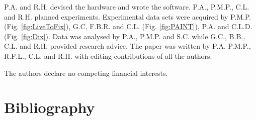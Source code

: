 \begin{contributions}
    P.A. and R.H. devised the hardware and wrote the software. P.A., P.M.P., C.L. and R.H. planned experiments. Experimental data sets were acquired by P.M.P. (Fig. \ref{fig:LiveToFix}), G.C, F.B.R. and C.L. (Fig. \ref{fig:PAINT}), P.A. and C.L.D. (Fig. \ref{fig:Dix}). Data was analysed by P.A., P.M.P. and S.C. while G.C., B.B., C.L. and R.H. provided research advice. The paper was written by P.A. P.M.P., R.F.L., C.L. and R.H. with editing contributions of all the authors.
\end{contributions}

\begin{interests}
    The authors declare no competing financial interests.
\end{interests}

\section*{Bibliography}


